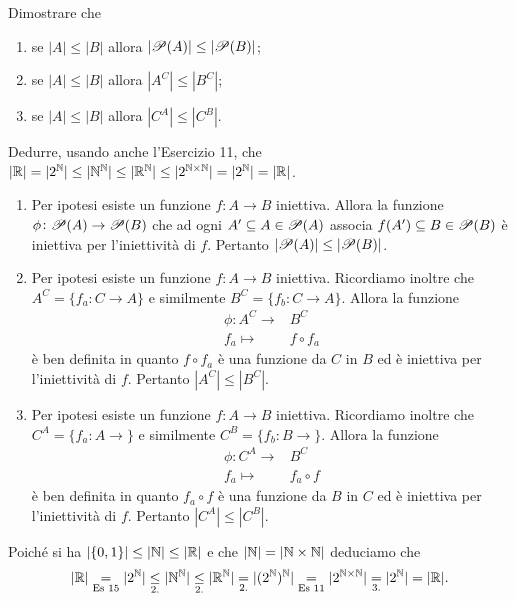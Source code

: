 \begin{es}
  Dimostrare che
  \begin{enumerate}
  \item se $ |A| \leq |B| $ allora $ |\P(A)| \leq |\P(B)| $;
  \item se $ |A| \leq |B| $ allora $ |A^C| \leq |B^C| $;
  \item se $ |A| \leq |B| $ allora $ |C^A| \leq |C^B| $.
  \end{enumerate}
  Dedurre, usando anche l'Esercizio 11, che $ |\R| = |2^\N| \leq |\N^\N| \leq |\R^\N| \leq |2^{\N \times \N}| = |2^\N| = |\R| $.
\end{es}
\begin{enumerate}
\item Per ipotesi esiste un funzione $ f \colon A \to B $ iniettiva. Allora la funzione $ \phi \colon \P(A) \to \P(B) $ che ad ogni $ A' \subseteq A \in \P(A) $ associa $ f(A') \subseteq B \in \P(B) $ è iniettiva per l'iniettività di $ f $. Pertanto  $ |\P(A)| \leq |\P(B)| $.
\item Per ipotesi esiste un funzione $ f \colon A \to B $ iniettiva. Ricordiamo inoltre che $ A^C = \{f_a \colon C \to A\} $ e similmente $ B^C = \{f_b \colon C \to A\} $. Allora la funzione
  \begin{align*}
    \phi \colon A^C \to & B^C \\
    f_a \mapsto & f \circ f_a
  \end{align*}
  è ben definita in quanto $ f \circ f_a $ è una funzione da $ C $ in $ B $ ed è iniettiva per l'iniettività di $ f $. Pertanto $ |A^C| \leq |B^C| $.
\item Per ipotesi esiste un funzione $ f \colon A \to B $ iniettiva. Ricordiamo inoltre che $ C^A = \{f_a \colon A \to \} $ e similmente $ C^B = \{f_b \colon B \to \} $. Allora la funzione
  \begin{align*}
    \phi \colon C^A \to & B^C \\
    f_a \mapsto & f_a \circ f
  \end{align*}
  è ben definita in quanto $ f_a \circ f $ è una funzione da $ B $ in $ C $ ed è iniettiva per l'iniettività di $ f $. Pertanto $ |C^A| \leq |C^B| $.
\end{enumerate}
Poiché si ha $ |\{0, 1\}| \leq |\N| \leq |\R| $ e che $ |\N| = |\N \times \N| $ deduciamo che
\[|\R| \underset{\text{Es 15}}{=} |2^\N| \underset{\text{2.}}{\leq} |\N^\N| \underset{\text{2.}}{\leq} |\R^\N| \underset{\text{2.}}{=} |(2^\N)^\N| \underset{\text{Es 11}}{=} |2^{\N \times \N}| \underset{\text{3.}}{=} |2^{\N}| = |\R|.\]

